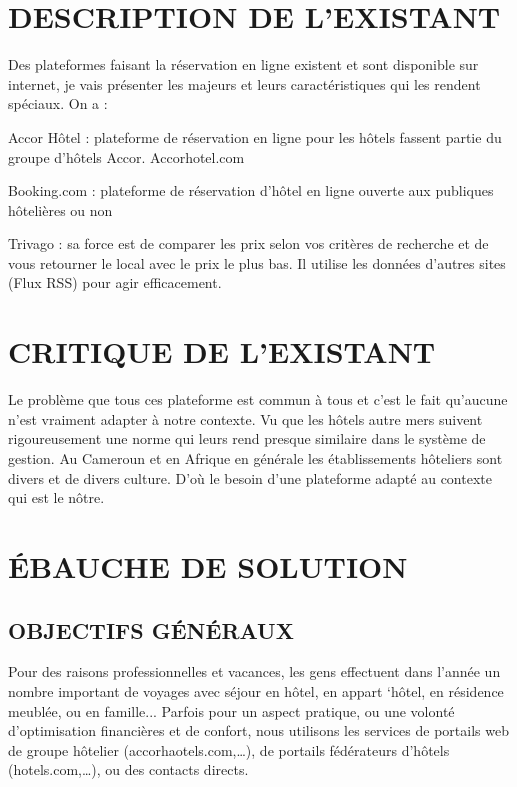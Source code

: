 \section{DESCRIPTION DE L'EXISTANT}
Des plateformes faisant la réservation en ligne existent et sont disponible sur internet, je vais présenter les majeurs et leurs caractéristiques qui les rendent spéciaux. On a :
\begin{list}{•}{ }
\item Accor Hôtel : plateforme de réservation en ligne pour les hôtels fassent partie du groupe d’hôtels Accor. Accorhotel.com
\item Booking.com : plateforme de réservation d’hôtel en ligne ouverte aux publiques hôtelières ou non
\item Trivago : sa force est de comparer les prix selon vos critères de recherche et de vous retourner le local avec le prix le plus bas.  Il utilise les données d’autres sites (Flux RSS) pour agir efficacement.

\end{list}

\section{CRITIQUE DE L’EXISTANT}
Le problème que tous ces plateforme est commun à tous et c’est le fait qu’aucune n’est vraiment adapter à notre contexte. Vu que les hôtels autre mers suivent rigoureusement une norme qui leurs rend presque similaire dans le système de gestion. Au Cameroun et en Afrique en générale les établissements hôteliers sont divers et de divers culture. D’où le besoin d’une plateforme adapté au contexte qui est le nôtre.

\section{ÉBAUCHE DE SOLUTION}
\subsection{OBJECTIFS GÉNÉRAUX}
Pour des raisons professionnelles et vacances, les gens effectuent dans l’année un nombre important de voyages avec séjour en hôtel, en appart ‘hôtel, en résidence meublée, ou en famille... Parfois pour un aspect pratique, ou une volonté d’optimisation financières et de confort, nous utilisons les services de portails web de groupe hôtelier (accorhaotels.com,…), de portails fédérateurs d’hôtels (hotels.com,…), ou des contacts directs.\\

